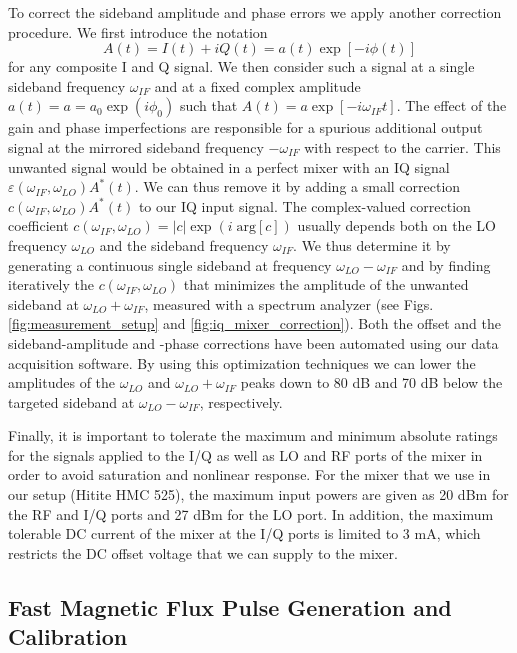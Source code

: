 To correct the sideband amplitude and phase errors we apply another correction procedure. We first introduce the notation
\begin{equation}
A(t) = I(t)+iQ(t) = a(t)\exp{[-i \phi(t)]} \label{eq:iq_if_input}
\end{equation}
for any composite I and Q signal. We then consider such a signal at a single sideband frequency $\omega_{IF}$ and at a fixed complex amplitude $a(t)=a= a_0\exp{(i\phi_0)}$ such that $A(t) =a \exp{[-i \omega_{IF} t]} $. The effect of the gain and phase imperfections are responsible for a spurious additional output signal at the mirrored sideband frequency $-\omega_{IF}$ with respect to the carrier. This unwanted signal would be obtained in a perfect mixer with an IQ signal $\varepsilon(\omega_{IF},\omega_{LO})A^*(t)$. We can thus remove it by adding a small correction $c(\omega_{IF},\omega_{LO})A^*(t)$ to our IQ input signal. The complex-valued correction coefficient $c(\omega_{IF},\omega_{LO})=|c|\exp{(i\;\mathrm{arg}[c])}$ usually depends both on the LO frequency $\omega_{LO}$ and the sideband frequency $\omega_{IF}$. We thus determine it  by generating a continuous single sideband at frequency  $\omega_{LO}-\omega_{IF}$  and by finding  iteratively the  $c(\omega_{IF},\omega_{LO})$ that minimizes the amplitude of the unwanted sideband at $\omega_{LO}+\omega_{IF}$, measured with a spectrum analyzer (see Figs.  \ref{fig:measurement_setup} and \ref{fig:iq_mixer_correction}). Both the offset and the sideband-amplitude and -phase corrections have been automated using our data acquisition software. By using this optimization techniques we can lower the amplitudes of the $\omega_{LO}$  and $\omega_{LO}+\omega_{IF}$ peaks down to 80 dB and 70 dB below the targeted sideband at $\omega_{LO}-\omega_{IF}$, respectively.

\smallskip

Finally, it is important to tolerate the maximum and minimum absolute ratings for the signals applied to the I/Q  as well as LO and RF ports of the mixer in order to avoid saturation and nonlinear response. For the mixer that we use in our setup (Hitite HMC 525), the maximum input powers are given as 20 dBm for the RF and I/Q ports and 27 dBm for the LO port. In addition, the maximum tolerable DC current of the mixer at the I/Q ports is limited to 3 mA, which restricts the DC offset voltage that we can supply to the mixer.

\subsection{Fast Magnetic Flux Pulse Generation and Calibration} \label{section:fast_flux_pulses}

